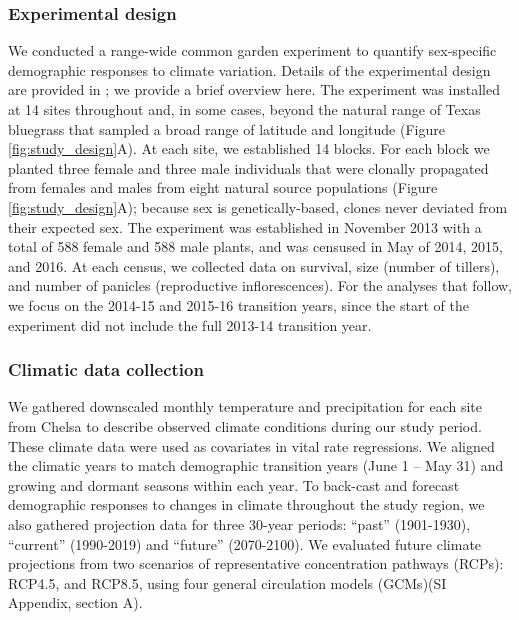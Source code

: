 \documentclass[9pt,twocolumn,twoside,lineno]{pnas-new}
\begin{document}
\subsubsection*{Experimental design}
We conducted a range-wide common garden experiment to quantify sex-specific demographic responses to climate variation. 
Details of the experimental design are provided in \cite{miller2022two}; we provide a brief overview here. 
The experiment was installed at 14 sites throughout and, in some cases, beyond the natural range of Texas bluegrass that sampled a broad range of latitude and longitude (Figure \ref{fig:study_design}A).
At each site, we established 14 blocks. 
For each block we planted three female and three male individuals that were clonally propagated from females and males from eight natural source populations (Figure \ref{fig:study_design}A); because sex is genetically-based, clones never deviated from their expected sex. 
The experiment was established in November 2013 with a total of 588 female and 588 male plants, and was censused in May of 2014, 2015, and 2016. 
At each census, we collected data on survival, size (number of tillers), and number of panicles (reproductive inflorescences). 
For the analyses that follow, we focus on the 2014-15 and 2015-16 transition years, since the start of the experiment did not include the full 2013-14 transition year. 

\subsubsection*{Climatic data collection}
We gathered downscaled monthly temperature and precipitation for each site from Chelsa \citep{karger2017climatologies} to describe observed climate conditions during our study period.
These climate data were used as covariates in vital rate regressions. 
We aligned the climatic years to match demographic transition years (June 1 -- May 31) and growing and dormant seasons within each year.
To back-cast and forecast demographic responses to changes in climate throughout the study region, we also gathered projection data for three 30-year periods: ``past'' (1901-1930), ``current'' (1990-2019) and ``future'' (2070-2100).
We evaluated future climate projections from two scenarios of representative concentration pathways (RCPs): RCP4.5, and RCP8.5, using four general circulation models (GCMs)(SI Appendix, section A). 
\end{document}
